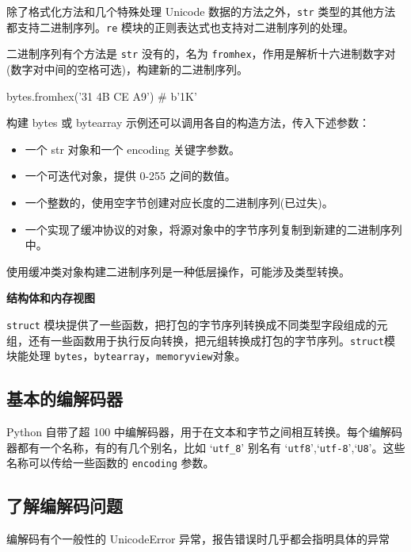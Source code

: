 除了格式化方法和几个特殊处理 Unicode 数据的方法之外，\texttt{str} 类型的其他方法都支持二进制序列。\texttt{re} 模块的正则表达式也支持对二进制序列的处理。

二进制序列有个方法是 \texttt{str} 没有的，名为 \texttt{fromhex}，作用是解析十六进制数字对(数字对中间的空格可选)，构建新的二进制序列。

\begin{python}
bytes.fromhex('31 4B CE A9')    # b'1K\xce{}'
\end{python}

构建 bytes 或 bytearray 示例还可以调用各自的构造方法，传入下述参数：
\begin{itemize}
    \item 一个 str 对象和一个 encoding 关键字参数。
    \item 一个可迭代对象，提供 0-255 之间的数值。
    \item 一个整数的，使用空字节创建对应长度的二进制序列(已过失)。
    \item 一个实现了缓冲协议的对象，将源对象中的字节序列复制到新建的二进制序列中。
\end{itemize}

使用缓冲类对象构建二进制序列是一种低层操作，可能涉及类型转换。



\noindent\textbf{结构体和内存视图}

\texttt{struct} 模块提供了一些函数，把打包的字节序列转换成不同类型字段组成的元组，还有一些函数用于执行反向转换，把元组转换成打包的字节序列。\texttt{struct}模块能处理 \texttt{bytes}，\texttt{bytearray}，\texttt{memoryview}对象。

\subsection{基本的编解码器}

Python 自带了超 100 中编解码器，用于在文本和字节之间相互转换。每个编解码器都有一个名称，有的有几个别名，比如 `\texttt{utf\_8}' 别名有 `\texttt{utf8}',`\texttt{utf-8}',`\texttt{U8}'。这些名称可以传给一些函数的 \texttt{encoding} 参数。

\subsection{了解编解码问题}

编解码有个一般性的 UnicodeError 异常，报告错误时几乎都会指明具体的异常

